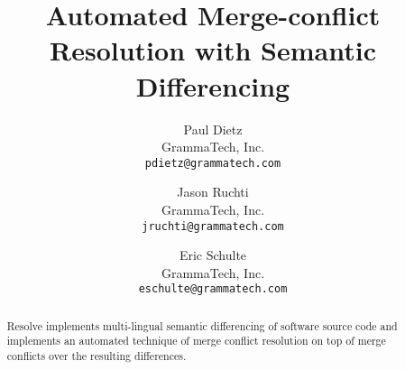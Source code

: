 \documentclass[letterpaper,twocolumn,10pt]{article}
\begin{document}
\title{Automated Merge-conflict Resolution with Semantic Differencing}

\author{
  {\rm Paul Dietz}\\
  GrammaTech, Inc.\\
  {\tt pdietz@grammatech.com}
  \and
  {\rm Jason Ruchti}\\
  GrammaTech, Inc.\\
  {\tt jruchti@grammatech.com}
  \and
  {\rm Eric Schulte}\\
  GrammaTech, Inc.\\
  {\tt eschulte@grammatech.com}
}

\maketitle

\begin{abstract}
Resolve implements multi-lingual semantic differencing of software
source code and implements an automated technique of merge conflict
resolution on top of merge conflicts over the resulting differences.
\end{abstract}










\end{document}
